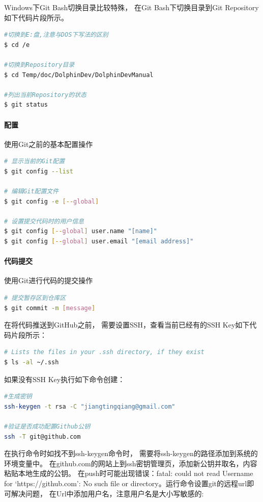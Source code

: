 \documentclass{book}
\begin{document}
Windows下Git Bash切换目录比较特殊，
在Git Bash下切换目录到Git Repository如下代码片段所示。

\begin{lstlisting}[language=Bash]
#切换到E:盘,注意与DOS下写法的区别
$ cd /e

#切换到Repository目录
$ cd Temp/doc/DolphinDev/DolphinDevManual

#列出当前Repository的状态
$ git status
\end{lstlisting}

\paragraph{配置}使用Git之前的基本配置操作

\begin{lstlisting}[language=Bash]
# 显示当前的Git配置
$ git config --list

# 编辑Git配置文件
$ git config -e [--global]

# 设置提交代码时的用户信息
$ git config [--global] user.name "[name]"
$ git config [--global] user.email "[email address]"
\end{lstlisting}

\paragraph{代码提交}使用Git进行代码的提交操作

\begin{lstlisting}[language=Bash]
# 提交暂存区到仓库区
$ git commit -m [message]
\end{lstlisting}

在将代码推送到GitHub之前，
需要设置SSH，查看当前已经有的SSH Key如下代码片段所示：

\begin{lstlisting}[language=Bash]
# Lists the files in your .ssh directory, if they exist
$ ls -al ~/.ssh 
\end{lstlisting}

如果没有SSH Key执行如下命令创建：

\begin{lstlisting}[language=Bash]
#生成密钥
ssh-keygen -t rsa -C "jiangtingqiang@gmail.com"

#验证是否成功配置Github公钥
ssh -T git@github.com 
\end{lstlisting}

在执行命令时如找不到ssh-keygen命令时，
需要将ssh-keygen的路径添加到系统的环境变量中。
在github.com的网站上到ssh密钥管理页，添加新公钥并取名，内容粘贴本地生成的公钥。
在push时可能出现错误：fatal: could not read Username for ‘https://github.com’: No such file or directory。运行命令设置git的远程url即可解决问题，
在Url中添加用户名，注意用户名是大小写敏感的:
\end{document}
